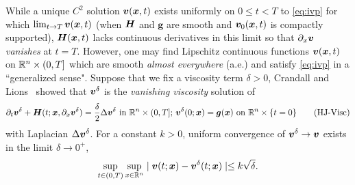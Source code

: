 While a unique $C^2$ solution $\bm{v}(\bm{x},t)$ exists uniformly on $0 \le t < T$ to \eqref{eq:ivp} for which $\lim_{t \rightarrow T} \bm{v}(\bm{x},t)$  (when $\bm{H}$ and $\bm{g}$ are smooth and $\bm{v}_0(\bm{x},t)$ is compactly supported), $\bm{H}(\bm{x},t)$ lacks continuous derivatives in this limit so that $\partial_x \bm{v}$ \textit{vanishes} at $t=T$. %
However, one may find Lipschitz continuous functions $\bm{v}(\bm{x},t)$ on $\mathbb{R}^n \times (0, T]$ which are smooth \textit{almost everywhere} (a.e.) and satisfy \eqref{eq:ivp} in a ``generalized sense". Suppose that we fix a viscosity term $\delta>0$, Crandall and Lions~\citet{CrandallTwoApprox} showed that $\bm{v}^\delta$ is the \textit{vanishing viscosity} solution of 
%
	\begin{align}
		\partial_t\bm{v}^\delta + \bm{H}(t; \bm{x}, \partial_x \bm{v}^\delta) = \dfrac{\delta}{2} \Delta \bm{v}^\delta \text{ in } \mathbb{R}^n \times (0, T]; \,
		\bm{v}^\delta(0; \bm{x}) = \bm{g}(\bm{x}) \text{ on } \mathbb{R}^n \times \{t=0\}
		\label{eq:ivp-viscous}
		\tag{HJ-Visc}
	\end{align}
%
with Laplacian $\Delta \bm{v}^\delta$. For a constant $k>0$, uniform convergence of $\bm{v}^\delta \rightarrow \bm{v}$ exists in the limit $\delta \rightarrow 0^+$, \ie
%
\begin{align}
	\sup_{t \in (0, T)} \sup_{x\in \mathbb{R}^n} \mid \bm{v}(t; \bm{x}) - \bm{v}^\delta(t; \bm{x})\mid \le k\sqrt{\delta}.
\end{align}
%

